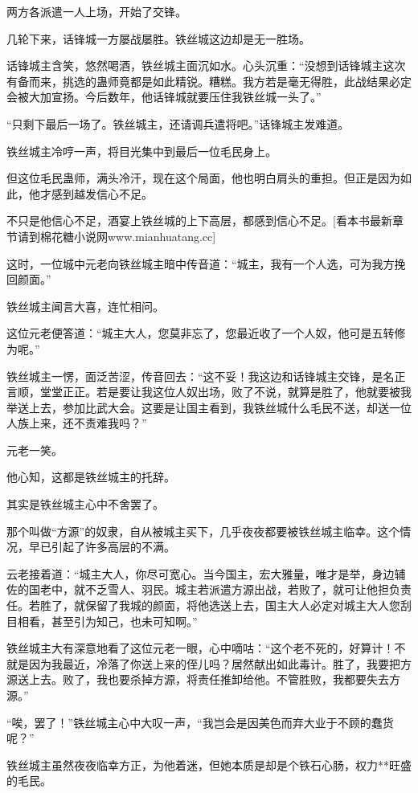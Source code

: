\begin{this_body}
两方各派遣一人上场，开始了交锋。

几轮下来，话锋城一方屡战屡胜。铁丝城这边却是无一胜场。

话锋城主含笑，悠然喝酒，铁丝城主面沉如水。心头沉重：“没想到话锋城主这次有备而来，挑选的蛊师竟都是如此精锐。糟糕。我方若是毫无得胜，此战结果必定会被大加宣扬。今后数年，他话锋城就要压住我铁丝城一头了。”

“只剩下最后一场了。铁丝城主，还请调兵遣将吧。”话锋城主发难道。

铁丝城主冷哼一声，将目光集中到最后一位毛民身上。

但这位毛民蛊师，满头冷汗，现在这个局面，他也明白肩头的重担。但正是因为如此，他才感到越发信心不足。

不只是他信心不足，酒宴上铁丝城的上下高层，都感到信心不足。[看本书最新章节请到棉花糖小说网www.mianhuatang.cc]

这时，一位城中元老向铁丝城主暗中传音道：“城主，我有一个人选，可为我方挽回颜面。”

铁丝城主闻言大喜，连忙相问。

这位元老便答道：“城主大人，您莫非忘了，您最近收了一个人奴，他可是五转修为呢。”

铁丝城主一愣，面泛苦涩，传音回去：“这不妥！我这边和话锋城主交锋，是名正言顺，堂堂正正。若是要让我这位人奴出场，败了不说，就算是胜了，他就要被我举送上去，参加比武大会。这要是让国主看到，我铁丝城什么毛民不送，却送一位人族上来，还不责难我吗？”

元老一笑。

他心知，这都是铁丝城主的托辞。

其实是铁丝城主心中不舍罢了。

那个叫做“方源”的奴隶，自从被城主买下，几乎夜夜都要被铁丝城主临幸。这个情况，早已引起了许多高层的不满。

云老接着道：“城主大人，你尽可宽心。当今国主，宏大雅量，唯才是举，身边辅佐的国老中，就不乏雪人、羽民。城主若派遣方源出战，若败了，就可让他担负责任。若胜了，就保留了我城的颜面，将他选送上去，国主大人必定对城主大人您刮目相看，甚至引为知己，也未可知啊。”

铁丝城主大有深意地看了这位元老一眼，心中嘀咕：“这个老不死的，好算计！不就是因为我最近，冷落了你送上来的侄儿吗？居然献出如此毒计。胜了，我要把方源送上去。败了，我也要杀掉方源，将责任推卸给他。不管胜败，我都要失去方源。”

“唉，罢了！”铁丝城主心中大叹一声，“我岂会是因美色而弃大业于不顾的蠢货呢？”

铁丝城主虽然夜夜临幸方正，为他着迷，但她本质是却是个铁石心肠，权力**旺盛的毛民。


\end{this_body}
